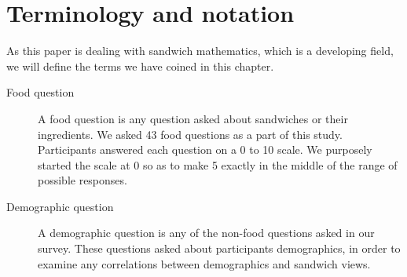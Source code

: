 \chapter{Terminology and notation}

As this paper is dealing with sandwich mathematics, which is a developing field, we will define the terms we have coined in this chapter.

\begin{description}
	\item[Food question] A food question is any question asked about sandwiches or their ingredients. We asked 43 food questions as a part of this study. Participants answered each question on a 0 to 10 scale. We purposely started the scale at 0 so as to make 5 exactly in the middle of the range of possible responses.
	\item[Demographic question] A demographic question is any of the non-food questions asked in our survey. These questions asked about participants demographics, in order to examine any correlations between demographics and sandwich views.
\end{description}
